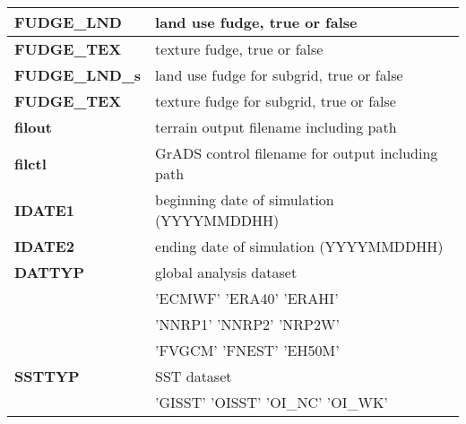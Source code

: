 \begin{table}[h]
\begin{center}
\begin{tabular}{|l|l|}
{\footnotesize {\bf FUDGE\_LND}}   & {\footnotesize land use fudge, true or false} \\ \hline
{\footnotesize {\bf FUDGE\_TEX}}   & {\footnotesize texture fudge, true or false} \\ \hline
{\footnotesize {\bf FUDGE\_LND\_s}} & {\footnotesize land use fudge for subgrid, true or false} \\ \hline
{\footnotesize {\bf FUDGE\_TEX}}   & {\footnotesize texture fudge for subgrid, true or false} \\ \hline
{\footnotesize {\bf filout}}   & {\footnotesize terrain output filename including path} \\ \hline
{\footnotesize {\bf filctl}}   & {\footnotesize GrADS control filename for output including path} \\ \hline
{\footnotesize {\bf IDATE1}}   & {\footnotesize beginning date of simulation (YYYYMMDDHH)} \\ \hline
{\footnotesize {\bf IDATE2}}   & {\footnotesize ending date of simulation (YYYYMMDDHH)} \\ \hline
{\footnotesize {\bf DATTYP}}   & {\footnotesize global analysis dataset} \\ 
 &  \vspace{-0.15 cm} \hspace{0.5 cm} {\footnotesize 'ECMWF'} \hspace{0.5 cm} {\footnotesize 'ERA40'}  \hspace{0.5 cm} {\footnotesize 'ERAHI'} \\
 &  \vspace{-0.15 cm}\hspace{0.5 cm} {\footnotesize 'NNRP1'} \hspace{0.5 cm} {\footnotesize 'NNRP2'} \hspace{0.5 cm} {\footnotesize 'NRP2W'}\\
 &  \vspace{-0.15 cm} \hspace{0.5 cm} {\footnotesize 'FVGCM'} \hspace{0.5 cm} {\footnotesize 'FNEST'} \hspace{0.5 cm} {\footnotesize 'EH50M'}\\
\hline
{\footnotesize {\bf SSTTYP}}  & {\footnotesize SST dataset } \\ 
 &  \vspace{-0.15 cm} \hspace{0.5 cm} {\footnotesize 'GISST'} \hspace{0.5 cm} {\footnotesize 'OISST'} \hspace{0.5 cm} {\footnotesize 'OI\_NC'} \hspace{0.5 cm} {\footnotesize 'OI\_WK'}\\ 

\end{tabular}
\end{center}
\end{table}
